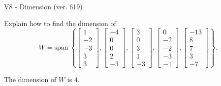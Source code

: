 \begin{exercise}
  \begin{exerciseTitle}V8 - Dimension (ver. 619)\end{exerciseTitle}
  \begin{exerciseStatement}
    Explain how to find the dimension of 
\[W=\mathrm{span}\ \left\{\left[\begin{array}{r}
1 \\
-2 \\
-3 \\
3 \\
3
\end{array}\right] , \left[\begin{array}{r}
-4 \\
0 \\
0 \\
2 \\
-3
\end{array}\right] , \left[\begin{array}{r}
3 \\
0 \\
3 \\
1 \\
-3
\end{array}\right] , \left[\begin{array}{r}
0 \\
-2 \\
-2 \\
-3 \\
-1
\end{array}\right] , \left[\begin{array}{r}
-13 \\
8 \\
7 \\
3 \\
-7
\end{array}\right]\right\}.\]



  \end{exerciseStatement}
  \begin{exerciseAnswer}
   The dimension of \(W\) is  \(4\).
  


  \end{exerciseAnswer}
\end{exercise}